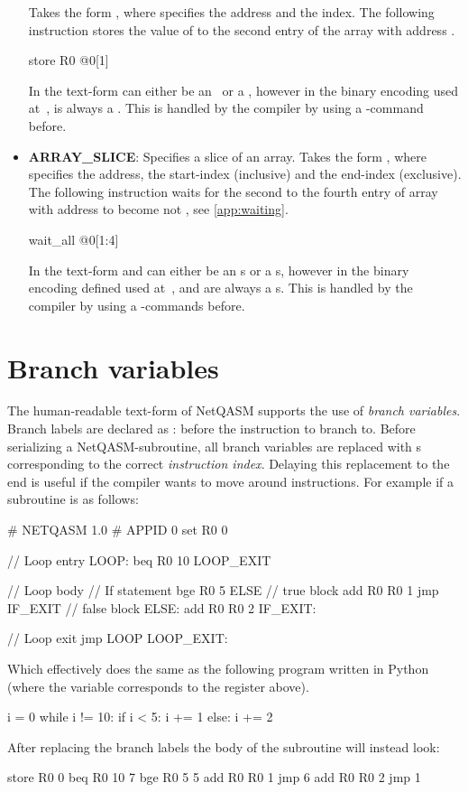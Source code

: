 \begin{itemize}
        Takes the form , where  specifies the address and  the index.
        The following instruction stores the value of  to the second entry of the array with address .
        \begin{nqcode}
store R0 @0[1]\end{nqcode}
        In the text-form  can either be an \IMMEDIATE\ or a \REGISTER, however in the binary encoding used at~\cite{git_netqasm},  is always a \REGISTER.
        This is handled by the compiler by using a -command before.
  \item \textbf{ARRAY\_SLICE}: Specifies a slice of an array.
        Takes the form , where  specifies the address,  the start-index (inclusive) and  the end-index (exclusive).
        The following instruction waits for the second to the fourth entry of array with address  to become not , see \cref{app:waiting}.
        \begin{nqcode}
wait_all @0[1:4]\end{nqcode}
        In the text-form  and  can either be an \IMMEDIATE{}s or a \REGISTER{}s, however in the binary encoding defined used at~\cite{git_netqasm},  and  are always a \REGISTER{}s.
        This is handled by the compiler by using a -commands before.
\end{itemize}

\section{Branch variables}
\label{sec:branch_variables}
The human-readable text-form of \ac{NetQASM} supports the use of \emph{branch variables}.
Branch labels are declared as : before the instruction to branch to.
Before serializing a \ac{NetQASM}-subroutine, all branch variables are replaced with \IMMEDIATE{}s corresponding to the correct \emph{instruction index}.
Delaying this replacement to the end is useful if the compiler wants to move around instructions.
For example if a subroutine is as follows:
\begin{nqcode}
# NETQASM 1.0
# APPID 0
set R0 0

// Loop entry
LOOP:
beq R0 10 LOOP_EXIT

// Loop body
// If statement
bge R0 5 ELSE
// true block
add R0 R0 1
jmp IF_EXIT
// false block
ELSE:
add R0 R0 2
IF_EXIT:

// Loop exit
jmp LOOP
LOOP_EXIT:\end{nqcode}
Which effectively does the same as the following program written in Python (where the variable  corresponds to the register  above).
\begin{pycode}
i = 0
while i != 10:
  if i < 5:
    i += 1
  else:
    i += 2
\end{pycode}
After replacing the branch labels the body of the subroutine will instead look:
\begin{nqcode}
store R0 0
beq R0 10 7
bge R0 5 5
add R0 R0 1
jmp 6
add R0 R0 2
jmp 1\end{nqcode}

